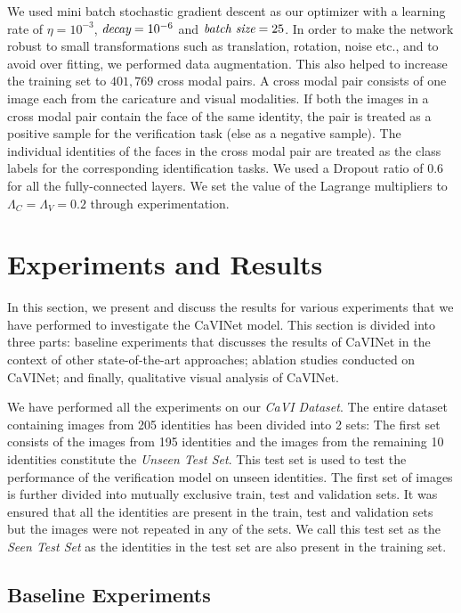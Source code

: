 We used mini batch stochastic gradient descent as our optimizer with a learning rate of $\eta = 10^{-3}$,  $\emph{decay}=10^{-6}$ and $\emph{batch size}= 25$. In order to make the network robust to small transformations such as translation, rotation, noise etc., and to avoid over fitting, we performed data augmentation. This also helped to increase the training set to $401,769$ cross modal pairs. A cross modal pair consists of one image each from the caricature and visual modalities. If both the images in a cross modal pair contain the face of the same identity, the pair is treated as a positive sample for the verification task (else as a negative sample). The individual identities of the faces in the cross modal pair are treated as the class labels for the corresponding identification tasks. We used a Dropout \cite{dropout_sri} ratio of 0.6 for all the fully-connected layers. We set the value of the Lagrange multipliers to  $\Lambda_{C}=\Lambda_{V}=0.2$ through experimentation.

\section{Experiments and Results}
In this section, we present and discuss the results for various experiments that we have performed to investigate the CaVINet model. This section is divided into three parts: baseline experiments that discusses the results of CaVINet in the context of other state-of-the-art approaches; ablation studies  conducted on CaVINet; and finally, qualitative visual analysis of CaVINet.

We have performed all the experiments on our \emph{CaVI Dataset}. The entire dataset containing images from 205 identities has been divided  into 2 sets: The first set consists of the images from 195 identities and the images from the remaining 10 identities constitute the \emph{Unseen Test Set}. This test set is used to test the performance of the verification model on unseen identities. The first set of images is further divided into mutually exclusive train, test and validation sets. It was ensured that all the identities are present in the train, test and validation sets but the images were not repeated in any of the sets. We call this test set as the \emph{Seen Test Set} as the identities in the test set are also present in the training set.

\subsection{Baseline Experiments}

